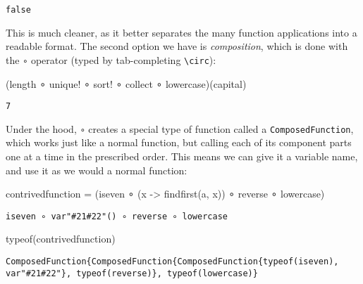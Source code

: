 \documentclass[
  letterpaper,
  DIV=11,
  numbers=noendperiod]{scrreprt}
\newenvironment{Shaded}{\begin{snugshade}}{\end{snugshade}}
\newcommand{\CharTok}[1]{\textcolor[rgb]{0.13,0.47,0.30}{#1}}
\newcommand{\FunctionTok}[1]{\textcolor[rgb]{0.28,0.35,0.67}{#1}}
\newcommand{\NormalTok}[1]{\textcolor[rgb]{0.00,0.23,0.31}{#1}}
\newcommand{\OperatorTok}[1]{\textcolor[rgb]{0.37,0.37,0.37}{#1}}
\begin{document}
\begin{verbatim}
false
\end{verbatim}

This is much cleaner, as it better separates the many function
applications into a readable format. The second option we have is
\emph{composition}, which is done with the \texttt{∘} operator (typed by
tab-completing \texttt{\textbackslash{}circ}):

\begin{Shaded}
\begin{Highlighting}[]
\NormalTok{(length }\OperatorTok{∘}\NormalTok{ unique! }\OperatorTok{∘}\NormalTok{ sort! }\OperatorTok{∘}\NormalTok{ collect }\OperatorTok{∘}\NormalTok{ lowercase)(capital)}
\end{Highlighting}
\end{Shaded}

\begin{verbatim}
7
\end{verbatim}

Under the hood, \texttt{∘} creates a special type of function called a
\texttt{ComposedFunction}, which works just like a normal function, but
calling each of its component parts one at a time in the prescribed
order. This means we can give it a variable name, and use it as we would
a normal function:

\begin{Shaded}
\begin{Highlighting}[]
\NormalTok{contrivedfunction }\OperatorTok{=}\NormalTok{ (iseven }\OperatorTok{∘}\NormalTok{ (x }\OperatorTok{{-}\textgreater{}} \FunctionTok{findfirst}\NormalTok{(}\CharTok{\textquotesingle{}a\textquotesingle{}}\NormalTok{, x)) }\OperatorTok{∘}\NormalTok{ reverse }\OperatorTok{∘}\NormalTok{ lowercase)}
\end{Highlighting}
\end{Shaded}

\begin{verbatim}
iseven ∘ var"#21#22"() ∘ reverse ∘ lowercase
\end{verbatim}

\begin{Shaded}
\begin{Highlighting}[]
\FunctionTok{typeof}\NormalTok{(contrivedfunction)}
\end{Highlighting}
\end{Shaded}

\begin{verbatim}
ComposedFunction{ComposedFunction{ComposedFunction{typeof(iseven), var"#21#22"}, typeof(reverse)}, typeof(lowercase)}
\end{verbatim}
\end{document}
